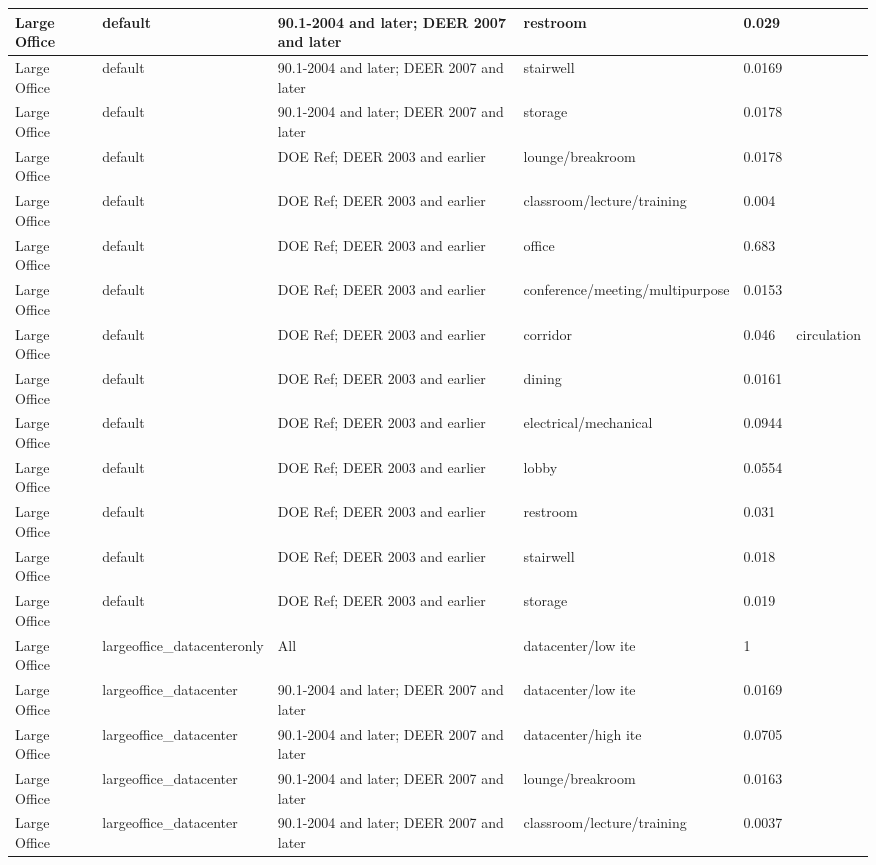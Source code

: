 \begin{center}
\begin{longtable}{|p{1.0in}|p{1.05in}|p{1.1in}|p{1.9in}|p{0.55in}|p{0.95in}|}
Large Office & default & 90.1-2004 and later; DEER 2007 and later & restroom & 0.029 &  \\ \hline
Large Office & default & 90.1-2004 and later; DEER 2007 and later & stairwell & 0.0169 &  \\ \hline
Large Office & default & 90.1-2004 and later; DEER 2007 and later & storage & 0.0178 &  \\ \hline
Large Office & default & DOE Ref; DEER 2003 and earlier & lounge/breakroom & 0.0178 &  \\ \hline
Large Office & default & DOE Ref; DEER 2003 and earlier & classroom/lecture/training & 0.004 &  \\ \hline
Large Office & default & DOE Ref; DEER 2003 and earlier & office & 0.683 &  \\ \hline
Large Office & default & DOE Ref; DEER 2003 and earlier & conference/meeting/multipurpose & 0.0153 &  \\ \hline
Large Office & default & DOE Ref; DEER 2003 and earlier & corridor & 0.046 & circulation \\ \hline
Large Office & default & DOE Ref; DEER 2003 and earlier & dining & 0.0161 &  \\ \hline
Large Office & default & DOE Ref; DEER 2003 and earlier & electrical/mechanical & 0.0944 &  \\ \hline
Large Office & default & DOE Ref; DEER 2003 and earlier & lobby & 0.0554 &  \\ \hline
Large Office & default & DOE Ref; DEER 2003 and earlier & restroom & 0.031 &  \\ \hline
Large Office & default & DOE Ref; DEER 2003 and earlier & stairwell & 0.018 &  \\ \hline
Large Office & default & DOE Ref; DEER 2003 and earlier & storage & 0.019 &  \\ \hline
Large Office & largeoffice\_datacenteronly & All & datacenter/low ite & 1 &  \\ \hline
Large Office & largeoffice\_datacenter & 90.1-2004 and later; DEER 2007 and later & datacenter/low ite & 0.0169 &  \\ \hline
Large Office & largeoffice\_datacenter & 90.1-2004 and later; DEER 2007 and later & datacenter/high ite & 0.0705 &  \\ \hline
Large Office & largeoffice\_datacenter & 90.1-2004 and later; DEER 2007 and later & lounge/breakroom & 0.0163 &  \\ \hline
Large Office & largeoffice\_datacenter & 90.1-2004 and later; DEER 2007 and later & classroom/lecture/training & 0.0037 &  \\ \hline

\end{longtable}
\end{center}
